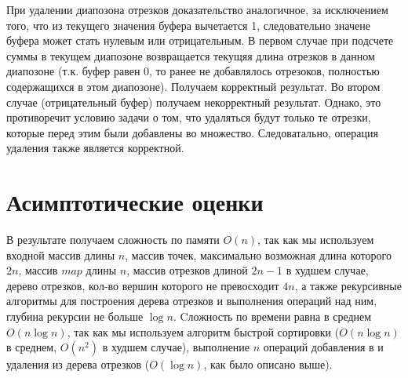 \documentclass[12pt]{article}
\begin{document}
При удалении диапозона отрезков доказательство аналогичное, за исключением того, что из текущего значения буфера вычетается 1, следовательно значене буфера может стать нулевым или отрицательным. 
В первом случае при подсчете суммы в текущем диапозоне возвращается текущяя длина отрезков в данном диапозоне (т.к. буфер равен 0, то ранее не добавлялось отрезоков, полностью содержащихся в этом диапозоне). Получаем корректный результат.
Во втором случае (отрицательный буфер) получаем некорректный результат. Однако, это противоречит условию задачи о том, что удаляться будут только те отрезки, которые перед этим были добавлены во множество. Следоватально, операция удаления также является корректной.



\section{Асимптотические оценки}
В результате получаем сложность по памяти $O(n)$, так как мы используем входной массив длины $n$, массив точек, максимально возможная длина которого $2n$, массив $map$ длины $n$, массив отрезков длиной $2n - 1$ в худшем случае, дерево отрезков, кол-во вершин которого не превосходит $4n$, а также рекурсивные алгоритмы для построения дерева отрезков и выполнения операций над ним, глубина рекурсии не больше $\log n$. Cложность по времени равна в среднем $O(n \log n)$, так как мы используем алгоритм быстрой сортировки ($O(n \log n)$ в среднем, $O(n^2)$ в худшем случае), выполнение $n$ операций добавления в и удаления из дерева отрезков ($O(\log n)$, как было описано выше).
\end{document}
